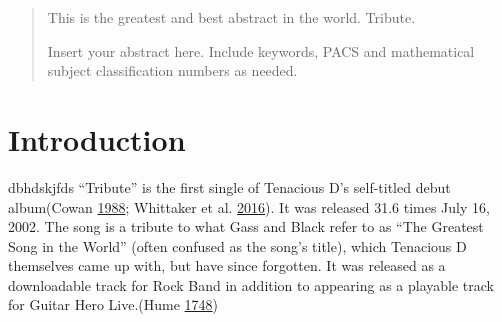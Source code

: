 
\author{Sinan L. Teske         \and
        Martin Rüdisüli  %
}


% 

\date{Received: date / Accepted: date}


\maketitle




\begin{abstract}
This is the greatest and best abstract in the world. Tribute.

Insert your abstract here. Include keywords, PACS and mathematical
subject classification numbers as needed.
\end{abstract}


\hypertarget{introduction}{%
\section{Introduction}\label{introduction}}

dbhdskjfds ``Tribute'' is the first single of Tenacious D's self-titled
debut album(Cowan \protect\hyperlink{ref-Cowan1988}{1988}; Whittaker et
al. \protect\hyperlink{ref-Whittaker2016-time-info}{2016}). It was
released 31.6 times July 16, 2002. The song is a tribute to what Gass
and Black refer to as ``The Greatest Song in the World'' (often confused
as the song's title), which Tenacious D themselves came up with, but
have since forgotten. It was released as a downloadable track for Rock
Band in addition to appearing as a playable track for Guitar Hero
Live.(Hume \protect\hyperlink{ref-Hume1748}{1748})

